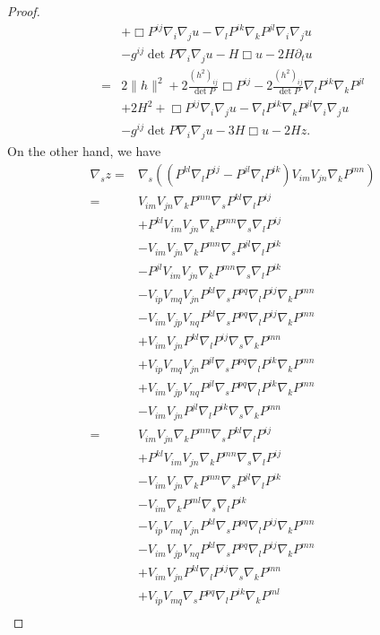 \documentclass{amsart}
\theoremstyle{definition}
\theoremstyle{remark}
\numberwithin{equation}{section}
\begin{document}
\begin{proof}
\begin{align*}
&+\Box P^{ij}\nabla_i\nabla_ju-\nabla_lP^{ik}\nabla_kP^{jl}\nabla_i\nabla_ju\\
&-g^{ij}\det P\nabla_i\nabla_ju-H\Box u-2H\partial_tu\\
=&2\|h\|^2+2\frac{(h^2)_{ij}}{\det P}\Box P^{ij}-2\frac{(h^2)_{ij}}{\det P}\nabla_lP^{ik}\nabla_kP^{jl}\\
&+2H^2+\Box P^{ij}\nabla_i\nabla_ju-\nabla_lP^{ik}\nabla_kP^{jl}\nabla_i\nabla_ju\\
&-g^{ij}\det P\nabla_i\nabla_ju-3H\Box u-2Hz.
\end{align*}
On the other hand, we have
\begin{align*}
\nabla_s z=&\nabla_s\left(\left(P^{kl}\nabla_l P^{ij}-P^{jl}\nabla_lP^{ik}\right)V_{im}V_{jn}\nabla_kP^{mn}\right)\\
=&V_{im}V_{jn}\nabla_kP^{mn}\nabla_s P^{kl}\nabla_l P^{ij}\\
&+P^{kl}V_{im}V_{jn}\nabla_kP^{mn}\nabla_s\nabla_l P^{ij}\\
&-V_{im}V_{jn}\nabla_kP^{mn}\nabla_sP^{jl}\nabla_lP^{ik}\\
&-P^{jl}V_{im}V_{jn}\nabla_kP^{mn}\nabla_s\nabla_lP^{ik}\\
&-V_{ip}V_{mq}V_{jn}P^{kl}\nabla_sP^{pq}\nabla_l P^{ij}\nabla_kP^{mn}\\
&-V_{im}V_{jp}V_{nq}P^{kl}\nabla_sP^{pq}\nabla_l P^{ij}\nabla_kP^{mn}\\
&+V_{im}V_{jn}P^{kl}\nabla_l P^{ij}\nabla_s\nabla_kP^{mn}\\
&+V_{ip}V_{mq}V_{jn}P^{jl}\nabla_sP^{pq}\nabla_lP^{ik}\nabla_kP^{mn}\\
&+V_{im}V_{jp}V_{nq}P^{jl}\nabla_sP^{pq}\nabla_lP^{ik}\nabla_kP^{mn}\\
&-V_{im}V_{jn}P^{jl}\nabla_lP^{ik}\nabla_s\nabla_kP^{mn}\\
=&V_{im}V_{jn}\nabla_kP^{mn}\nabla_s P^{kl}\nabla_l P^{ij}\\
&+P^{kl}V_{im}V_{jn}\nabla_kP^{mn}\nabla_s\nabla_l P^{ij}\\
&-V_{im}V_{jn}\nabla_kP^{mn}\nabla_sP^{jl}\nabla_lP^{ik}\\
&-V_{im}\nabla_kP^{ml}\nabla_s\nabla_lP^{ik}\\
&-V_{ip}V_{mq}V_{jn}P^{kl}\nabla_sP^{pq}\nabla_l P^{ij}\nabla_kP^{mn}\\
&-V_{im}V_{jp}V_{nq}P^{kl}\nabla_sP^{pq}\nabla_l P^{ij}\nabla_kP^{mn}\\
&+V_{im}V_{jn}P^{kl}\nabla_l P^{ij}\nabla_s\nabla_kP^{mn}\\
&+V_{ip}V_{mq}\nabla_sP^{pq}\nabla_lP^{ik}\nabla_kP^{ml}\\

\end{align*}
\end{proof}
\end{document}
